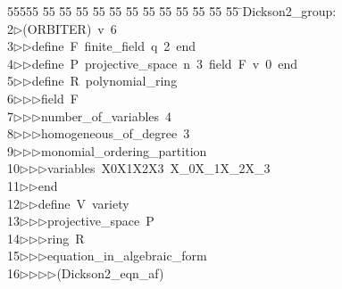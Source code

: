 %
%
\begin{tabbing}
55555 \= 55 \= 55 \= 55 \= 55 \= 55 \= 55 \= 55 \= 55 \= 55 \= 55 \= 55 \= 55 \= \>Dickson2\_group:\\[0pt]
2\>$\triangleright$\>(ORBITER)\ v\ 6\ \\[0pt]
3\>$\triangleright$\>$\triangleright$\>define\ F\ finite\_field\ q\ 2\ end\ \\[0pt]
4\>$\triangleright$\>$\triangleright$\>define\ P\ projective\_space\ n\ 3\ field\ F\ v\ 0\ end\ \\[0pt]
5\>$\triangleright$\>$\triangleright$\>define\ R\ polynomial\_ring\ \\[0pt]
6\>$\triangleright$\>$\triangleright$\>$\triangleright$\>field\ F\ \\[0pt]
7\>$\triangleright$\>$\triangleright$\>$\triangleright$\>number\_of\_variables\ 4\ \\[0pt]
8\>$\triangleright$\>$\triangleright$\>$\triangleright$\>homogeneous\_of\_degree\ 3\ \\[0pt]
9\>$\triangleright$\>$\triangleright$\>$\triangleright$\>monomial\_ordering\_partition\ \\[0pt]
10\>$\triangleright$\>$\triangleright$\>$\triangleright$\>variables\ X0X1X2X3\ X\_0X\_1X\_2X\_3\ \\[0pt]
11\>$\triangleright$\>$\triangleright$\>end\ \\[0pt]
12\>$\triangleright$\>$\triangleright$\>define\ V\ variety\ \\[0pt]
13\>$\triangleright$\>$\triangleright$\>$\triangleright$\>projective\_space\ P\ \\[0pt]
14\>$\triangleright$\>$\triangleright$\>$\triangleright$\>ring\ R\ \\[0pt]
15\>$\triangleright$\>$\triangleright$\>$\triangleright$\>equation\_in\_algebraic\_form\ \\[0pt]
16\>$\triangleright$\>$\triangleright$\>$\triangleright$\>$\triangleright$\>(Dickson2\_eqn\_af)\ \\[0pt]

\end{tabbing}
